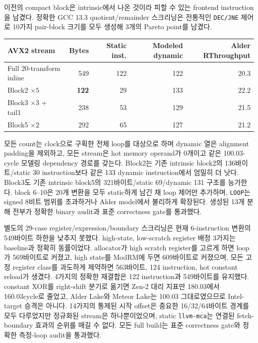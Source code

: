 \documentclass[11pt,a4paper]{article}
\begin{document}
이전의 compact block은 intrinsic에서 나온 것이라 피할 수 있는 frontend
instruction을 남겼다.  정확한 GCC 13.3 quotient/remainder 스크리닝은
전통적인 \texttt{DEC/JNE} 제어로 10가지 pair-block 크기를 모두 생성해
3개의 Pareto point를 남겼다.

\begin{center}
\small
\begin{tabular}{lrrrr}
\toprule
AVX2 stream & Bytes & Static inst. & Modeled dynamic & Alder RThroughput \\
\midrule
Full 20-transform inline & 549 & 122 & 122 & 20.3 \\
Block2 $\times 5$ & \textbf{122} & 29 & 133 & 22.2 \\
Block3 $\times 3$ + tail1 & 238 & 53 & 129 & 21.5 \\
Block5 $\times 2$ & 292 & 65 & 127 & 21.2 \\
\bottomrule
\end{tabular}
\end{center}

모든 count는 clock으로 구획한 전체 loop를 대상으로 하며 dynamic 열은
alignment padding을 제외하고, 모든 stream은 hot memory operand가
0개이고 같은 100.03-cycle 모델링 dependency 경로를 갖는다.  Block2는
기존 intrinsic block2의 136바이트/static 30 instruction보다 같은 133
dynamic instruction에서 엄밀히 더 낫다.  Block3도 기존 intrinsic
block5의 321바이트/static 69/dynamic 131 구조를 능가한다.  block
6--10은 20개 변환을 모두 static하게 남긴 채 loop 제어만 추가하며,
\texttt{LOOP}는 signed 8비트 범위를 초과하거나 Alder model에서 불리하게
확장된다.  생성된 13개 분해 전부가 정확한 binary audit과 표준
correctness gate를 통과했다.

별도의 29-case register/expression/boundary 스크리닝은 현재
6-instruction 변환의 549바이트 하한을 낮추지 못했다.  high-state,
low-scratch register 배정 3가지는 baseline과 정확히 동률이었다.
allocator가 high scratch register를 고르게 하면 loop가 569바이트로
커졌고, high state를 ModRM에 두면 609바이트로 커졌으며, 모든 고정
register class를 과도하게 제약하면 563바이트, 124 instruction, hot
constant reload가 생겼다.  4가지의 정확한 재결합은 122 instruction과
549바이트를 유지했다.  constant XOR를 right-shift 분기로 옮기면
Zen-2 대리 지표만 180.03에서 160.03cycle로 줄었고, Alder Lake와 Meteor
Lake는 100.03 그대로였으므로 Intel-target 승격은 아니다.  14가지의
통제된 시작 offset은 중요한 16/32/64바이트 경계를 모두 다루었지만
정규화된 stream은 하나뿐이었으며, static \texttt{llvm-mca}는 연결된
fetch-boundary 효과의 순위를 매길 수 없다.  모든 full build는
표준 correctness gate와 정확한 측정-loop audit을 통과했다.
\end{document}
